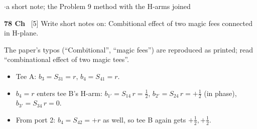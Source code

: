 {\color{sub}\footnotesize {} \gap$\cdot$\gap a short note; the Problem 9 method with the H-arms joined}

\begin{asked}{\textbf{78 Ch} \ [5]}
Write short notes on: Combitional effect of two magic fees connected in H-plane.
\end{asked}
{\color{sub}\footnotesize The paper's typos (``Combitional'', ``magic fees'') are reproduced as printed; read ``combinational effect of two magic tees''.}
\begin{itemize}
  \item Tee A: $b_3 = S_{31} = r$, $b_4 = S_{41} = r$.
  \item $b_4 = r$ enters tee B's H-arm: $b_{1'} = S_{14}\,r = \tfrac12$,
    $b_{2'} = S_{24}\,r = +\tfrac12$ (in phase), $b_{3'} = S_{34}\,r = 0$.
  \item From port 2: $b_4 = S_{42} = +r$ as well, so tee B again gets $+\tfrac12, +\tfrac12$.
\end{itemize}
\par{}
